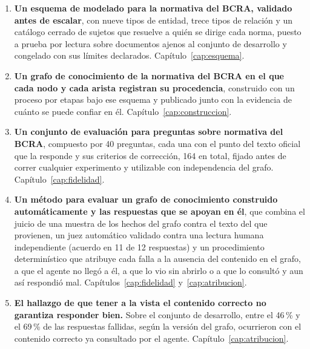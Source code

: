 \documentclass[12pt,a4paper]{report}
\begin{document}
\begin{enumerate}
  \item \textbf{Un esquema de modelado para la normativa del BCRA, validado
    antes de escalar}, con nueve tipos de entidad, trece tipos de relación
    y un catálogo cerrado de sujetos que resuelve a quién se dirige cada
    norma, puesto a prueba por lectura sobre documentos ajenos al conjunto
    de desarrollo y congelado con sus límites declarados.
    Capítulo~\ref{cap:esquema}.

  \item \textbf{Un grafo de conocimiento de la normativa del BCRA en el que
    cada nodo y cada arista registran su procedencia}, construido con un
    proceso por etapas bajo ese esquema y publicado junto con la evidencia
    de cuánto se puede confiar en él. Capítulo~\ref{cap:construccion}.

  \item \textbf{Un conjunto de evaluación para preguntas sobre normativa
    del BCRA}, compuesto por 40 preguntas, cada una con el punto del texto oficial que la responde y sus criterios de corrección, 164 en total, fijado antes de correr
    cualquier experimento y utilizable con independencia del grafo.
    Capítulo~\ref{cap:fidelidad}.

  \item \textbf{Un método para evaluar un grafo de conocimiento
    construido automáticamente y las respuestas que se apoyan en él},
    que combina el juicio de una muestra de los hechos del grafo contra
    el texto del que provienen, un juez automático validado contra una
    lectura humana independiente (acuerdo en 11 de 12 respuestas) y un
    procedimiento determinístico que atribuye cada falla a la ausencia
    del contenido en el grafo, a que el agente no llegó a él, a que lo
    vio sin abrirlo o a que lo consultó y aun así respondió mal.
    Capítulos~\ref{cap:fidelidad} y~\ref{cap:atribucion}.

  \item \textbf{El hallazgo de que tener a la vista el contenido correcto
    no garantiza responder bien.} Sobre el conjunto de desarrollo, entre
    el 46\,\% y el 69\,\% de las respuestas fallidas, según la versión
    del grafo, ocurrieron con el contenido correcto ya consultado por el
    agente. Capítulo~\ref{cap:atribucion}.
\end{enumerate}
\end{document}
